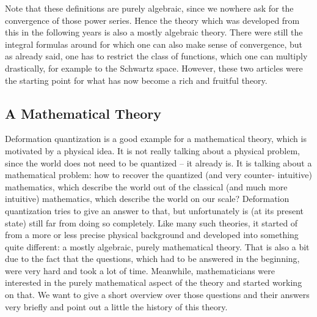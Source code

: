 Note that these definitions are purely algebraic, since we nowhere ask for the 
convergence of those power series. Hence the theory which was developed from 
this in the following years is also a mostly algebraic theory. There were still 
the integral formulas around for which one can also make sense of convergence, 
but as already said, one has to restrict the class of functions, which one can 
multiply drastically, for example to the Schwartz space. However, these two 
articles were the starting point for what has now become a rich and fruitful 
theory.



\subsection{A Mathematical Theory}
\label{subsec:chap2_MathTheory}
Deformation quantization is a good example for a mathematical theory, which is 
motivated by a physical idea. It is not really talking about a physical problem, 
since the world does not need to be quantized -- it already is. It is talking 
about a mathematical problem: how to recover the quantized (and very counter-
intuitive) mathematics, which describe the world out of the classical (and much 
more intuitive) mathematics, which describe the world on our scale? Deformation 
quantization tries to give an answer to that, but unfortunately is (at its 
present state) still far from doing so completely. Like many such theories, it 
started of from a more or less precise physical background and developed into 
something quite different: a mostly algebraic, purely mathematical theory. That 
is also a bit due to the fact that the questions, which had to be answered in 
the beginning, were very hard and took a lot of time. Meanwhile, mathematicians 
were interested in the purely mathematical aspect of the theory and started 
working on that. We want to give a short overview over those questions and their 
answers very briefly and point out a little the history of this theory.


